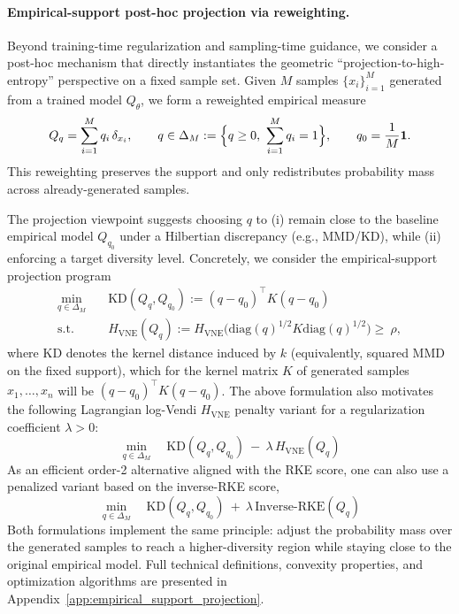 \documentclass{article}
\theoremstyle{plain}
\theoremstyle{definition}
\begin{document}
\paragraph{Empirical-support post-hoc projection via reweighting.}
Beyond training-time regularization and sampling-time guidance, we consider a post-hoc mechanism that directly instantiates the geometric ``projection-to-high-entropy'' perspective on a fixed sample set. Given $M$ samples $\{x_i\}_{i=1}^M$ generated from a trained model $Q_\theta$, we form a reweighted empirical measure
\[
Q_q=\sum_{i=1}^M q_i\,\delta_{x_i},
\qquad q\in\Delta_M:=\Bigl\{q\ge 0,\ \sum_{i=1}^M q_i=1\Bigr\},
\qquad q_0=\frac{1}{M}\mathbf{1}.
\]
This reweighting preserves the support and only redistributes probability mass across already-generated samples.

The projection viewpoint suggests choosing $q$ to (i) remain close to the baseline empirical model $Q_{q_0}$ under a Hilbertian discrepancy (e.g., MMD/KD), while (ii) enforcing a target diversity level. Concretely, we consider the empirical-support projection program
\begin{equation}\label{eq:main_posthoc_projection}
\begin{aligned}
\min_{q\in\Delta_M}\quad & \mathrm{KD}\left(Q_q,Q_{q_0}\right) := (q-q_0)^\top K(q-q_0)\\
\text{s.t.}\quad & H_{\mathrm{VNE}}(Q_q):= H_{\mathrm{VNE}}\bigl(\mathrm{diag}(q)^{1/2} K \mathrm{diag}(q)^{1/2}\bigr) \ge\ \rho,
\end{aligned}
\end{equation}
where $\mathrm{KD}$ denotes the kernel distance induced by $k$ (equivalently, squared MMD on the fixed support), which for the kernel matrix $K$ of generated samples $x_1,\ldots , x_n$ will be $(q-q_0)^\top K(q-q_0)$. The above formulation also motivates the following Lagrangian log-Vendi $H_{\mathrm{VNE}}$ penalty variant for a regularization coefficient $\lambda > 0$:
\begin{equation}\label{eq:main_posthoc_projection_vendi_lagrangian}
\min_{q\in\Delta_M}\quad \mathrm{KD}\left(Q_q,Q_{q_0}\right)\ -\ \lambda\,H_{\mathrm{VNE}}(Q_q)
\end{equation}
As an efficient order-2 alternative aligned with the RKE score, one can also use a penalized variant based on the inverse-RKE score,
\begin{equation}\label{eq:main_posthoc_projection_rke}
\min_{q\in\Delta_M}\quad \mathrm{KD}\left(Q_q,Q_{q_0}\right)\ +\ \lambda\,\mathrm{Inverse\text{-}RKE}(Q_q)
\end{equation}
Both formulations implement the same principle: adjust the probability mass over the generated samples to reach a higher-diversity region while staying close to the original empirical model. Full technical definitions, convexity properties, and optimization algorithms are presented in Appendix~\ref{app:empirical_support_projection}.
\end{document}
